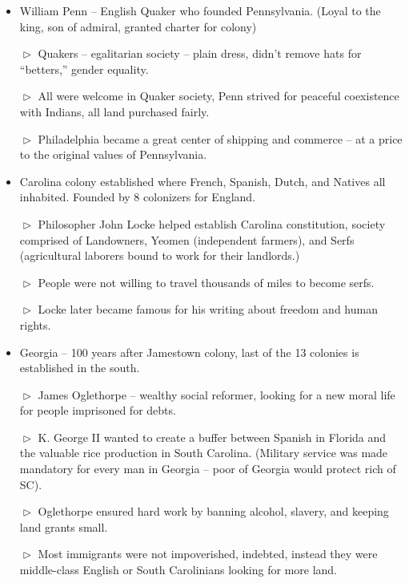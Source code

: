 \documentclass[10pt]{article}
\begin{document}
\begin{flushleft}
\begin{multicols}{2}
\begin{itemize}
 \item William Penn – English Quaker who founded Pennsylvania. (Loyal to the king, son of admiral, granted charter for colony)
 \item[$\vartriangleright$] Quakers – egalitarian society – plain dress, didn’t remove hats for “betters,” gender equality.
 \item[$\vartriangleright$] All were welcome in Quaker society, Penn strived for peaceful coexistence with Indians, all land purchased fairly.
 \item[$\vartriangleright$] Philadelphia became a great center of shipping and commerce – at a price to the original values of Pennsylvania.
 \item Carolina colony established where French, Spanish, Dutch, and Natives all inhabited. Founded by 8 colonizers for England.
 \item[$\vartriangleright$] Philosopher John Locke helped establish Carolina constitution, society comprised of Landowners, Yeomen (independent farmers), and Serfs (agricultural laborers bound to work for their landlords.)
 \item[$\vartriangleright$] People were not willing to travel thousands of miles to become serfs.
 \item[$\vartriangleright$] Locke later became famous for his writing about freedom and human rights.
 \item Georgia – 100 years after Jamestown colony, last of the 13 colonies is established in the south.
 \item[$\vartriangleright$] James Oglethorpe – wealthy social reformer, looking for a new moral life for people imprisoned for debts.
 \item[$\vartriangleright$] K. George II wanted to create a buffer between Spanish in Florida and the valuable rice production in South Carolina. (Military service was made mandatory for every man in Georgia – poor of Georgia would protect rich of SC).
 \item[$\vartriangleright$] Oglethorpe ensured hard work by banning alcohol, slavery, and keeping land grants small.
 \item[$\vartriangleright$] Most immigrants were not impoverished, indebted, instead they were middle-class English or South Carolinians looking for more land.
 \end{itemize}
\end{multicols}
\end{flushleft}
\end{document}
